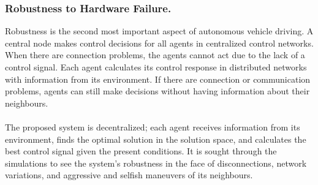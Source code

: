 \subsubsection{Robustness to Hardware Failure. }
Robustness is the second most important aspect of autonomous vehicle driving. A central node makes control decisions for all agents in centralized control networks. When there are connection problems, the agents cannot act due to the lack of a control signal. Each agent calculates its control response in distributed networks with information from its environment. If there are connection or communication problems, agents can still make decisions without having information about their neighbours.
\\
\\
The proposed system is decentralized; each agent receives information from its environment, finds the optimal solution in the solution space, and calculates the best control signal given the present conditions.
It is sought through the simulations to see the system's robustness in the face of disconnections, network variations, and aggressive and selfish maneuvers of its neighbours.






